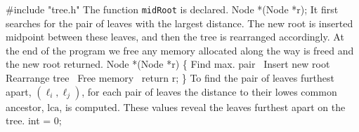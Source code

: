 #include "tree.h"
\nwendcode{}\nwdocspar
The function \texttt{midRoot} is declared.
\nwenddocs{}\plusendmoddef\nwstartdeflinemarkup{}\nwenddeflinemarkup
Node *(Node *r);
\nwendcode{}\nwdocspar
It first searches for the pair of leaves with the largest
distance. The new root is inserted midpoint between these leaves, and
then the tree is rearranged accordingly. At the end of the program we
free any memory allocated along the way is freed and the new root
returned.
\nwenddocs{}\plusendmoddef\nwstartdeflinemarkup{}\nwenddeflinemarkup
Node *(Node *r) \{
  \LA{}Find max. pair~{\nwtagstyle{}}\RA{}
  \LA{}Insert new root~{\nwtagstyle{}}\RA{}
  \LA{}Rearrange tree~{\nwtagstyle{}}\RA{}
  \LA{}Free memory~{\nwtagstyle{}}\RA{}
  return r;
\}
\nwendcode{}\nwdocspar
To find the pair of leaves furthest apart, $(\ell_i,\ell_j)$, for each
pair of leaves the distance to their lowes common ancestor,
$\mathrm{lca}$, is computed. These values reveal the leaves furthest
apart on the tree.
\nwenddocs{}\endmoddef\nwstartdeflinemarkup{}\nwenddeflinemarkup
int  = 0;
